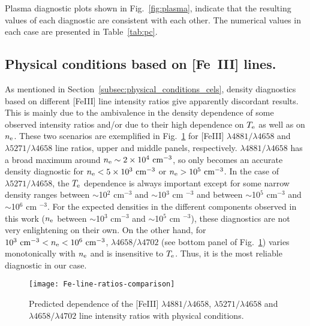 \documentclass[fleqn,usenatbib]{mnras}
\begin{document}
Plasma diagnostic plots shown in Fig.~\ref{fig:plasma}, indicate that the resulting values of each diagnostic are consistent with each other. The numerical values in each case are presented in Table~\ref{tab:pc}. 

\subsection{Physical conditions based on [Fe~III] lines.}
\label{subsec:iron_conditions}



As mentioned in Section~\ref{subsec:physical_conditions_cels}, density diagnostics based on different [Fe\thinspace III] line intensity ratios give apparently discordant results. This is mainly due to the ambivalence in the density dependence of some observed intensity ratios and/or due to their high dependence on $T_{\rm e}$ as well as on $n_{\rm e}$. These two scenarios are exemplified in Fig.~\ref{fig:predicted_ratios_feiii} for [Fe\thinspace III] $\lambda4881/\lambda4658$ and $\lambda5271/\lambda4658$ line ratios, upper and middle panels, respectively. $\lambda 4881/\lambda 4658$ has a broad maximum around $n_{\rm e} \sim 2\times 10^4 \text{ cm}^{-3}$, so only becomes an accurate density diagnostic for $n_{\rm e}<5\times 10^3 \text{ cm}^{-3}$ or $n_{\rm e}>10^5\text{ cm}^{-3}$. In the case of $\lambda 5271/\lambda 4658$, the $T_{\rm e}$ dependence is always important except for some narrow density ranges between $\sim$10$^2$ cm$^{-3}$ and $\sim$10$^3$ cm $^{-3}$ and between $\sim$10$^5$ cm$^{-3}$ and $\sim$10$^6$ cm $^{-3}$. For the expected densities in the different components observed in this work ($n_{\rm e}$ between $\sim$10$^3$ cm$^{-3}$ and $\sim$10$^5$ cm $^{-3}$), these diagnostics are not very enlightening on their own. On the other hand, for $10^3 \text{ cm}^{-3}<n_{\rm e}<10^6 \text{ cm}^{-3}$, $\lambda 4658/\lambda 4702$ (see bottom panel of Fig.~\ref{fig:predicted_ratios_feiii}) varies monotonically with $n_{\rm e}$ and is insensitive to $T_{\rm e}$. Thus, it is the most reliable diagnostic in our case. 





\begin{figure}
\texttt{[image: Fe-line-ratios-comparison]}
\caption{Predicted dependence of the [Fe\thinspace III] $\lambda4881/\lambda4658$, $\lambda5271/\lambda4658$ and $\lambda4658/\lambda4702$
line intensity ratios with physical conditions.}
\label{fig:predicted_ratios_feiii}
\end{figure}
\end{document}
